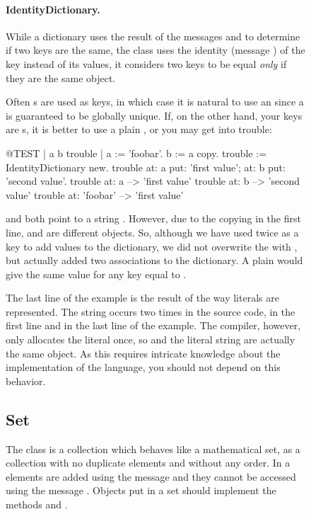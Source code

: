 \documentclass[a4paper,10pt,twoside]{book}
\begin{document}
\begin{figure}
\begin{center}
\paragraph{IdentityDictionary.}
While a dictionary uses the result of the messages \ct{=} and  to determine if two keys are the same, the class  uses the identity (message ) of the key instead of its values, \ie it considers two keys to be equal \emph{only} if they are the same object.

Often s are used as keys, in which case it is natural to use an  since a  is guaranteed to be globally unique.
If, on the other hand, your keys are s, it is better to use a plain , or you may get into trouble:

\begin{code}{@TEST | a b trouble |}
a := 'foobar'.
b := a copy.
trouble := IdentityDictionary new.
trouble 
    at: a put: 'first value'; 
    at: b put: 'second value'.
trouble at: a          --> 'first value'
trouble at: b          --> 'second value'
trouble at: 'foobar' --> 'first value'
\end{code}

\noindent
{} and  both point to a string . However, due to the copying in the first line,  and  are different objects. So, although we have used  twice as a key to add values to the dictionary, we did not overwrite the  with , but actually added two associations to the dictionary.
A plain  would give the same value for any key equal to .

The last line of the example is the result of the way literals are represented. The string  occurs two times in the source code, in the first line and in the last line of the example. The compiler, however, only allocates the literal once, so  and the literal string  are actually the same object. As this requires intricate knowledge about the implementation of the language, you should not depend on this behavior.


\subsection{Set}
The class  is a collection which behaves like a mathematical set, \ie as a collection with no duplicate elements and without any order.
In a  elements are added using the message  and they cannot be accessed using the message .
Objects put in a set should implement the methods  and \ct{=}.


\end{center}
\end{figure}
\end{document}
